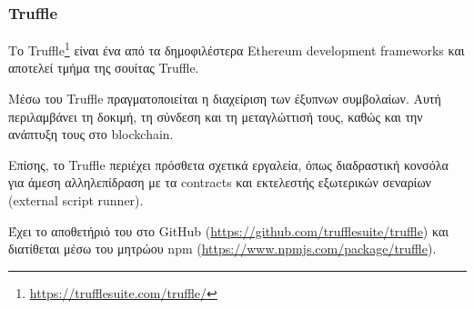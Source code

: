 \subsubsection{Truffle} \label{subsection:4-3-3-1-truffle}


Το Truffle\footnote{\url{https://trufflesuite.com/truffle/}} είναι ένα από τα δημοφιλέστερα Ethereum development frameworks και αποτελεί τμήμα της σουίτας Truffle.

Μέσω του Truffle πραγματοποιείται η διαχείριση των έξυπνων συμβολαίων. Αυτή περιλαμβάνει τη δοκιμή, τη σύνδεση και τη μεταγλώττισή τους, καθώς και την ανάπτυξη τους στο blockchain.

Επίσης, το Truffle περιέχει πρόσθετα σχετικά εργαλεία, όπως διαδραστική κονσόλα για άμεση αλληλεπίδραση με τα contracts  και εκτελεστής εξωτερικών σεναρίων (external script runner). 

Έχει το αποθετήριό του στο GitHub (\url{https://github.com/trufflesuite/truffle}) και διατίθεται μέσω του μητρώου npm (\url{https://www.npmjs.com/package/truffle}).